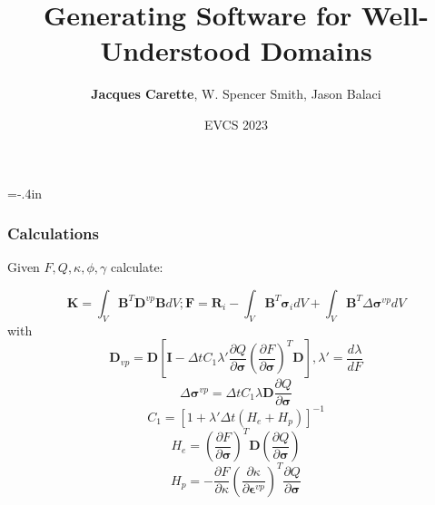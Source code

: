 \documentclass[usenames,dvipsnames]{beamer}
\title{Generating Software for Well-Understood Domains}
\author{\textbf{Jacques Carette}, W. Spencer Smith, Jason Balaci}
\institute[McMaster University]
{
  Computing and Software Department\\
  McMaster University
}
\date[EVCS 2023] %
{EVCS 2023}
\begin{document}
\hoffset=-.4in %
\begin{frame}[plain]


\titlepage

\end{frame}
\hoffset=0in %

%  
%  
%  

  
\begin{frame}
  
  \frametitle{Calculations}
  
  Given $F, Q, \kappa, \phi, \gamma$ calculate:

  \begin{equation} \label{EqImplicitFEM}
    \mathbf{K} = \int_V \mathbf{B}^T \mathbf{D}^{vp} \mathbf{B} dV; \mathbf{F} = \mathbf{R}_i - \int_V \mathbf{B}^T \bm{\sigma}_i dV + \int_V \mathbf{B}^T
    \Delta
    \bm{\sigma}^{vp} dV
    \end{equation}
    with
    \begin{equation}
    \mathbf{D}_{vp} =
    \mathbf{D} \left [
    \mathbf{I} - {\Delta t} C_1 \lambda' \frac{\partial Q}{\partial \bm{\sigma}} \left ( \frac{\partial F}{\partial
    \bm{\sigma}} \right )^{T} \mathbf{D}
    \right ], \lambda' = \frac{d \lambda}{d F}
    \end{equation}
    \begin{equation}
    \Delta \bm{\sigma}^{vp} = \Delta t C_1 \lambda \mathbf{D} \frac{\partial Q}{\partial \bm{\sigma}}
    \end{equation}
    \begin{equation}
    C_1 = [1 + \lambda' {\Delta t} (H_e + H_p)]^{-1}
    \end{equation}
    \begin{equation}
    \label{HEE}
    H_e = \left ( \frac{\partial F}{\partial \bm{\sigma}} \right )^T \mathbf{D} (\frac{\partial Q}{\partial \bm{\sigma}})
    \end{equation}
    \begin{equation}
    H_p = -\frac{\partial F}{\partial \kappa} \left ( \frac{\partial \kappa}{\partial \bm{\epsilon}^{vp}}
    \right )^T \frac{\partial Q}{\partial \bm{\sigma}}
    \end{equation}
  
  \end{frame}
  
\end{document}
